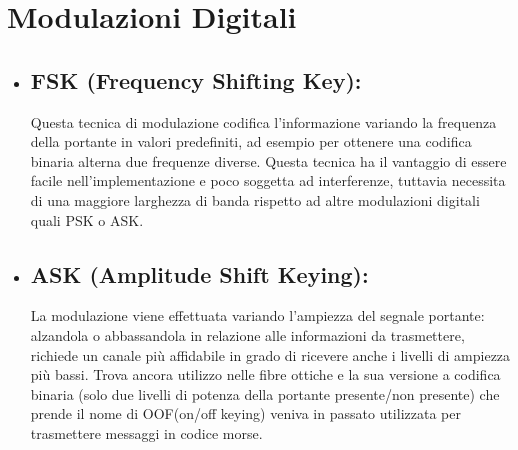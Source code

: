 \section{Modulazioni Digitali}
\label{sec:context}
\begin{itemize}
  \item \subsection{FSK (Frequency Shifting Key): } Questa tecnica di modulazione codifica l'informazione variando la frequenza della portante in valori predefiniti, ad esempio per ottenere una codifica binaria alterna due frequenze diverse. Questa tecnica ha il vantaggio di essere facile nell'implementazione e poco soggetta ad interferenze, tuttavia necessita di una maggiore larghezza di banda rispetto ad altre modulazioni digitali quali PSK o ASK.
  \cite{fsk}
  \item \subsection{ASK (Amplitude Shift Keying): } La modulazione viene effettuata variando l'ampiezza del segnale portante: alzandola o abbassandola in relazione alle informazioni da trasmettere, richiede un canale più affidabile in grado di ricevere anche i livelli di ampiezza più bassi. Trova ancora utilizzo nelle fibre ottiche e la sua versione a codifica binaria (solo due livelli di potenza della portante presente/non presente) che prende il nome di OOF(on/off keying) veniva in passato utilizzata per trasmettere messaggi in codice morse.
  \cite{ask}
  

\end{itemize}
